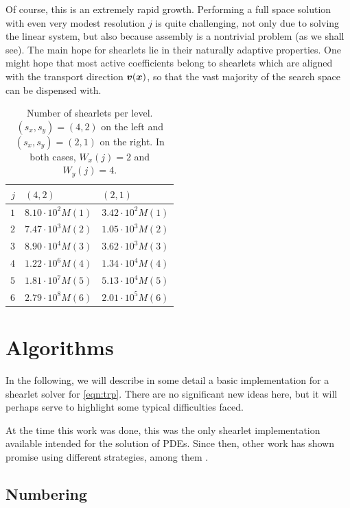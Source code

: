 Of course, this is an extremely rapid growth. Performing a full space solution with even very modest
resolution $j$ is quite challenging, not only due to solving the linear system, but also because assembly is a
nontrivial problem (as we shall see). The main hope for shearlets lie in their naturally adaptive properties.
One might hope that most active coefficients belong to shearlets which are aligned with the transport
direction ${\bm v}({\bm x})$, so that the vast majority of the search space can be dispensed with.

\begin{table}
\centering
\def\arraystretch{1.4}
\begin{tabular}{r@{\qquad}l@{\qquad}l}
$j$ & $(4,2)$ & $(2,1)$ \\
\hline $1$ & $8.10\cdot10^{2}M(1)$ & $3.42\cdot10^{2}M(1)$ \\
\hline $2$ & $7.47\cdot10^{3}M(2)$ & $1.05\cdot10^{3}M(2)$ \\
\hline $3$ & $8.90\cdot10^{4}M(3)$ & $3.62\cdot10^{3}M(3)$ \\
\hline $4$ & $1.22\cdot10^{6}M(4)$ & $1.34\cdot10^{4}M(4)$ \\
\hline $5$ & $1.81\cdot10^{7}M(5)$ & $5.13\cdot10^{4}M(5)$ \\
\hline $6$ & $2.79\cdot10^{8}M(6)$ & $2.01\cdot10^{5}M(6)$ \\
\end{tabular}
\caption{Number of shearlets per level. $(s_x,s_y)=(4,2)$ on the left and $(s_x,s_y)=(2,1)$ on the right. In
both cases, $W_x(j)=2$ and $W_y(j)=4$.} \label{tbl:numlets}
\end{table}

\section{Algorithms} \label{sec:algorithms}

In the following, we will describe in some detail a basic implementation for a shearlet solver for
\eqref{eqn:trp}. There are no significant new ideas here, but it will perhaps serve to highlight some typical
difficulties faced.

At the time this work was done, this was the only shearlet implementation available intended for the solution
of PDEs. Since then, other work has shown promise using different strategies, among them \cite{Obermeier2013}.

\subsection{Numbering}


